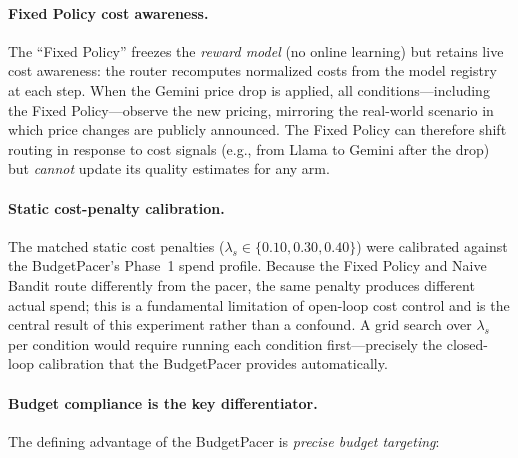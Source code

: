 \paragraph{Fixed Policy cost awareness.}
The ``Fixed Policy'' freezes the \emph{reward model} (no online
learning) but retains live cost awareness: the router recomputes
normalized costs from the model registry at each step.
When the Gemini price drop is applied, all conditions---including
the Fixed Policy---observe the new pricing, mirroring the real-world
scenario in which price changes are publicly announced.
The Fixed Policy can therefore shift routing in response to cost
signals (e.g., from Llama to Gemini after the drop) but
\emph{cannot} update its quality estimates for any arm.

\paragraph{Static cost-penalty calibration.}
The matched static cost penalties ($\lambda_s \in \{0.10, 0.30,
0.40\}$) were calibrated against the BudgetPacer's Phase~1 spend
profile.
Because the Fixed Policy and Naive Bandit route differently from
the pacer, the same penalty produces different actual spend;
this is a fundamental limitation of open-loop cost control and is
the central result of this experiment rather than a confound.
A grid search over $\lambda_s$ per condition would require running
each condition first---precisely the closed-loop calibration that
the BudgetPacer provides automatically.


\paragraph{Budget compliance is the key differentiator.}
The defining advantage of the BudgetPacer is \emph{precise budget
targeting}:

